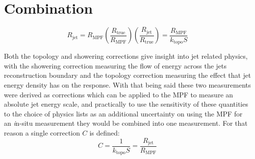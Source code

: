 \section{Combination}

\begin{equation}
  R_{\mathrm{jet}} = R_{\mathrm{MPF}}\left(\frac{R_{\mathrm{true}}}{R_{\mathrm{MPF}}}\right)\left(\frac{R_{\mathrm{jet}}}{R_{\mathrm{true}}}\right) = \frac{R_{\mathrm{MPF}}}{k_{\mathrm{topo}}S}
\end{equation}

Both the topology and showering corrections give insight into jet related physics, with the showering correction measuring the flow of energy across the jets reconstruction boundary and the topology correction measuring the effect that jet energy density has on the response.  
With that being said these two measurements were derived as corrections which can be applied to the MPF to measure an absolute jet energy scale, and practically to use the sensitivity of these quantities to the choice of physics lists as an additional uncertainty on using the MPF for an {\textit in-situ} measurement they would be combined into one measurement.  
For that reason a single correction $C$ is defined:
\begin{equation}
  C = \frac{1}{k_{\mathrm{topo}}S} = \frac{R_{\mathrm{jet}}}{R_{\mathrm{MPF}}}
\end{equation}





